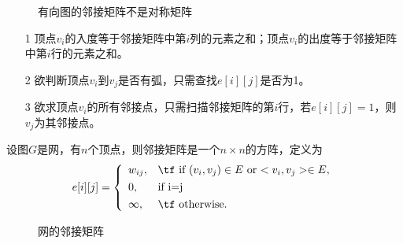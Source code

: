\begin{frame}\ft{\subsecname}
\begin{figure}
\centering

\caption{有向图的邻接矩阵不是对称矩阵}
\end{figure}
\end{frame}


\begin{frame}\ft{\subsecname}
\begin{itemize}
\item[1] 顶点$v_i$的入度等于邻接矩阵中第$i$列的元素之和；顶点$v_i$的出度等于邻接矩阵中第$i$行的元素之和。\\[0.1in]
\item[2] 欲判断顶点$v_i$到$v_j$是否有弧，只需查找$e[i][j]$是否为1。\\[0.1in]
\item[3] 欲求顶点$v_i$的所有邻接点，只需扫描邻接矩阵的第$i$行，若$e[i][j]=1$，则$v_j$为其邻接点。
\end{itemize}
\end{frame}

\begin{frame}\ft{\subsecname}
设图$G$是网，有$n$个顶点，则邻接矩阵是一个$n\times n$的方阵，定义为
$$
e[i][j]=\left\{
\begin{array}{ll}
w_{ij}, & \mbox{\tf if $(v_i,v_j)\in E$ or $<v_i,v_j>\in E$}, \\[0.05in]
0,& \mbox{if i=j}\\[0.05in]
\infty,&\mbox{\tf otherwise}.
\end{array}
\right.
$$
\end{frame}


\begin{frame}\ft{\subsecname}
\begin{figure}
\centering

\caption{网的邻接矩阵}
\end{figure}

\end{frame}


\begin{frame}\ft{\subsecname}

\end{frame}

\begin{frame}\ft{\subsecname}

\end{frame}



